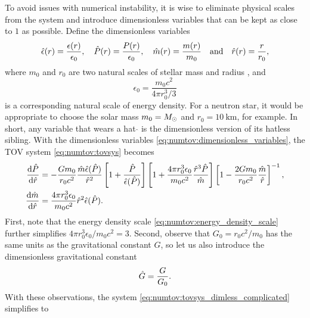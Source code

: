 To avoid issues with numerical instability, it is wise to eliminate physical scales from the system and introduce dimensionless variables that can be kept as close to $1$ as possible.
Define the dimensionless variables
\begin{equation}
	\hat{\epsilon}(r) = \frac{\epsilon(r)}{\epsilon_0}, \quad
	\hat{P}(r) = \frac{P(r)}{\epsilon_0}, \quad
	\hat{m}(r) = \frac{m(r)}{m_0} \quad \text{and} \quad
	\hat{r}(r) = \frac{r}{r_0},
\label{eq:numtov:dimensionless_variables}
\end{equation}
where $m_0$ and $r_0$ are two natural scales of stellar mass  and radius , and
\begin{equation}
	\epsilon_0 = \frac{m_0 c^2}{4 \pi r_0^3 / 3}
\label{eq:numtov:energy_density_scale}
\end{equation}
is a corresponding natural scale of energy density.
For a neutron star, it would be appropriate to choose the solar mass $m_0 = M_\odot$ and $r_0 = \SI{10}{\kilo\meter}$, for example.
In short, any variable that wears a hat $\hat{}$ is the dimensionless version of its hatless sibling.
With the dimensionless variables \eqref{eq:numtov:dimensionless_variables}, the TOV system \eqref{eq:numtov:tovsys} becomes
\begin{subequations}
\label{eq:numtov:tovsys_dimless_complicated}
\begin{align}
	\odv{\diml{P}}{\diml{r}} &= -\frac{G m_0}{r_0 c^2} \frac{\diml{m} \diml{\epsilon}(\diml{P})}{\diml{r}^2} \left[ 1 + \frac{\diml{P}}{\diml{\epsilon}(\diml{P})} \right] \left[ 1 + \frac{4 \pi r_0^3 \epsilon_0}{m_0 c^2} \frac{\diml{r}^3 \diml{P}}{\diml{m}} \right] \left[ 1 - \frac{2 G m_0}{r_0 c^2} \frac{\diml{m}}{\diml{r}} \right]^{-1} , \\
	\odv{\diml{m}}{\diml{r}} &= \frac{4 \pi r_0^3 \epsilon_0}{m_0 c^2} \diml{r}^2\diml{\epsilon}(\diml{P}) .
\end{align}
\end{subequations}
First, note that the energy density scale \eqref{eq:numtov:energy_density_scale} further simplifies $4 \pi r_0^3 \epsilon_0 / m_0 c^2 = 3$.
Second, observe that $G_0 = r_0 c^2 / m_0$ has the same units as the gravitational constant $G$, so let us also introduce the dimensionless gravitational constant
\begin{equation}
	\hat{G} = \frac{G}{G_0} .
\end{equation}
With these observations, the system \eqref{eq:numtov:tovsys_dimless_complicated} simplifies to

